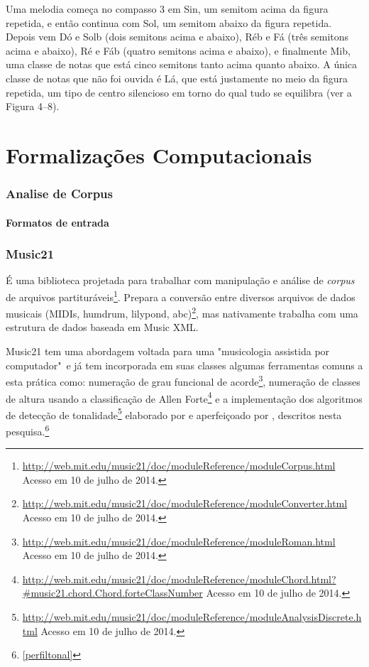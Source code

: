 \documentclass[
	12pt,				%
	openright,			%
	twoside,			%
	a4paper,			%
	english,			%
	french,				%
	spanish,			%
	brazil				%
	]{abntex2}
\begin{document}
Uma melodia começa no compasso 3 em Sin, um semitom acima da figura repetida, e
então continua com Sol, um semitom abaixo da figura repetida. Depois vem Dó e Solb
(dois semitons acima e abaixo), Réb e Fá (três semitons acima e abaixo), Ré e Fáb (quatro
semitons acima e abaixo), e finalmente Mib, uma classe de notas que está cinco semitons
tanto acima quanto abaixo. A única classe de notas que não foi ouvida é Lá, que está
justamente no meio da figura repetida, um tipo de centro silencioso em torno do qual tudo
se equilibra (ver a Figura 4–8).
\cite[ p.121]{straus2004}


%
%
%

\part{Formalizações Computacionais}

\section{Analise de Corpus}

\subsection{Formatos de entrada}

\section{Music21}

É uma biblioteca projetada para trabalhar com manipulação e análise de \textit{corpus} de arquivos partituráveis\footnote{\url{http://web.mit.edu/music21/doc/moduleReference/moduleCorpus.html} Acesso em 10 de julho de 2014.}. Prepara a conversão entre diversos arquivos de dados musicais (MIDIs, humdrum, lilypond, abc)\footnote{\url{http://web.mit.edu/music21/doc/moduleReference/moduleConverter.html} Acesso em 10 de julho de 2014.}, mas nativamente trabalha com uma estrutura de dados baseada em Music XML.

Music21 tem uma abordagem voltada para uma "musicologia assistida por computador"\ e já tem incorporada em suas classes algumas ferramentas comuns a esta prática como: numeração de grau funcional de acorde\footnote{\url{http://web.mit.edu/music21/doc/moduleReference/moduleRoman.html} Acesso em 10 de julho de 2014.}, numeração de classes de altura usando a classificação de Allen Forte\footnote{\url{http://web.mit.edu/music21/doc/moduleReference/moduleChord.html?\#music21.chord.Chord.forteClassNumber} Acesso em 10 de julho de 2014.} e a implementação dos algoritmos de detecção de tonalidade\footnote{\url{http://web.mit.edu/music21/doc/moduleReference/moduleAnalysisDiscrete.html} Acesso em 10 de julho de 2014.} elaborado por  e aperfeiçoado por , descritos nesta pesquisa.\footnote{\autoref{perfiltonal}}
\end{document}
